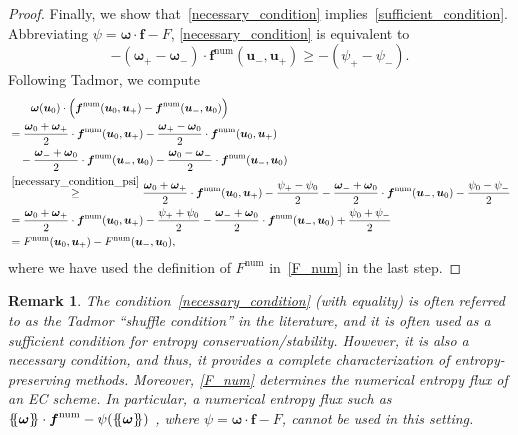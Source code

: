 \documentclass[]{scrartcl}
\newcommand*{\ldblbrace}{\{\mskip-5mu \left \{}
\newcommand*{\rdblbrace}{ \}\mskip-5mu \right \}}
\newcommand{\mean}[1]{\left\ldblbrace #1 \right\rdblbrace}
\renewcommand{\vec}[1]{\boldsymbol{#1}}
\newtheorem{remark}[theorem]{Remark}
\theoremstyle{definition}
\begin{document}
\begin{proof}
Finally, we show that~\eqref{necessary_condition} implies~\eqref{sufficient_condition}.
Abbreviating $\psi = \vec{\omega} \cdot \vec{f} - F$, \eqref{necessary_condition} is equivalent to
\begin{equation}
-\left (\vec{\omega}_+ - \vec{\omega}_- \right ) \cdot \vec{f}^\mathrm{num}(\vec{u}_-, \vec{u}_+) \ge - \left(\psi_+ - \psi_-\right).
\label{necessary_condition_psi}
\end{equation}
Following Tadmor, we compute
\begin{equation}
\begin{aligned}
    &\qquad
    \vec{\omega}(\vec{u}_0) \cdot \Bigl ( \vec{f}^\mathrm{num}(\vec{u}_0, \vec{u}_+) - \vec{f}^\mathrm{num}(\vec{u}_-, \vec{u}_0) \Bigr )
    \\
    &=
    \frac{\vec{\omega}_0 + \vec{\omega}_+}{2} \cdot \vec{f}^\mathrm{num}(\vec{u}_0, \vec{u}_+)
    - \frac{\vec{\omega}_+ - \vec{\omega}_0}{2} \cdot \vec{f}^\mathrm{num}(\vec{u}_0, \vec{u}_+)
    \\
    &\quad
    - \frac{\vec{\omega}_- + \vec{\omega}_0}{2} \cdot \vec{f}^\mathrm{num}(\vec{u}_-, \vec{u}_0)
    - \frac{\vec{\omega}_0 - \vec{\omega}_-}{2} \cdot \vec{f}^\mathrm{num}(\vec{u}_-, \vec{u}_0)
    \\
    &\stackrel{\eqref{necessary_condition_psi}}{\ge}
    \frac{\vec{\omega}_0 + \vec{\omega}_+}{2} \cdot \vec{f}^\mathrm{num}(\vec{u}_0, \vec{u}_+)
    - \frac{\psi_+ - \psi_0}{2}
    - \frac{\vec{\omega}_- + \vec{\omega}_0}{2} \cdot \vec{f}^\mathrm{num}(\vec{u}_-, \vec{u}_0)
    - \frac{\psi_0 - \psi_-}{2}
    \\
    &=
    \frac{\vec{\omega}_0 + \vec{\omega}_+}{2} \cdot \vec{f}^\mathrm{num}(\vec{u}_0, \vec{u}_+)
    - \frac{\psi_+ + \psi_0}{2}
    - \frac{\vec{\omega}_- + \vec{\omega}_0}{2} \cdot \vec{f}^\mathrm{num}(\vec{u}_-, \vec{u}_0)
    + \frac{\psi_0 + \psi_-}{2}
    \\
    &=
    F^{\mathrm{num}}(\vec{u}_0, \vec{u}_+) - F^{\mathrm{num}}(\vec{u}_-, \vec{u}_0),
\end{aligned}
\end{equation}
where we have used the definition of $F^{\mathrm{num}}$ in~\eqref{F_num} in the last step.
\end{proof}

\begin{remark}
    The condition~\eqref{necessary_condition} (with equality) is often referred to as the Tadmor ``shuffle condition'' in the literature, and it is often used as a sufficient condition for entropy conservation/stability.
    However, it is also a necessary condition, and thus, it provides a complete characterization of entropy-preserving methods.
    Moreover, \eqref{F_num} determines the numerical entropy flux of an EC scheme.
    In particular, a numerical entropy flux such as $\mean{\vec{\omega}} \cdot \vec{f}^{\mathrm{num}}  - \psi(\mean{\vec{\omega}})$ \cite[Eq.~(33)]{abgrall2018general}, where $\psi = \vec{\omega} \cdot \vec{f} - F$, cannot be used in this setting.
\end{remark}
\end{document}
